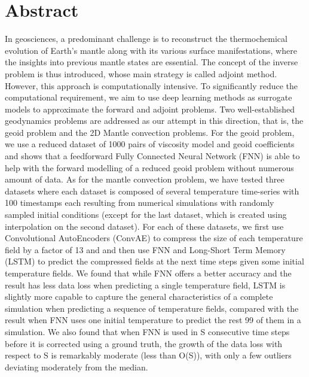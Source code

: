 \chapter*{Abstract}
In geosciences, a predominant challenge is to reconstruct the thermochemical evolution of Earth's mantle along with its various surface manifestations, where the insights into previous mantle states are essential. The concept of the inverse problem is thus introduced, whose main strategy is called adjoint method. However, this approach is computationally intensive. To significantly reduce the computational requirement, we aim to use deep learning methods as surrogate models to approximate the forward and adjoint problems. Two well-established geodynamics problems are addressed as our attempt in this direction, that is, the geoid problem and the 2D Mantle convection problems. For the geoid problem, we use a reduced dataset of 1000 pairs of viscosity model and geoid coefficients and shows that a feedforward Fully Connected Neural Network (FNN) is able to help with the forward modelling of a reduced geoid problem without numerous amount of data. As for the mantle convection problem, we have tested three datasets where each dataset is composed of several temperature time-series with 100 timestamps each resulting from numerical simulations with randomly sampled initial conditions (except for the last dataset, which is created using interpolation on the second dataset). For each of these datasets, we first use Convolutional AutoEncoders (ConvAE) to compress the size of each temperature field by a factor of 13 and and then use FNN and Long-Short Term Memory (LSTM) to predict the compressed fields at the next time steps given some initial temperature fields. We found that while FNN offers a better accuracy and the result has less data loss when predicting a single temperature field, LSTM is slightly more capable to capture the general characteristics of a complete simulation when predicting a sequence of temperature fields, compared with the result when FNN uses one initial temperature to predict the rest 99 of them in a simulation. We also found that when FNN is used in S consecutive time steps before it is corrected using a ground truth, the growth of the data loss with respect to S is remarkably moderate (less than O(S)), with only a few outliers deviating moderately from the median.